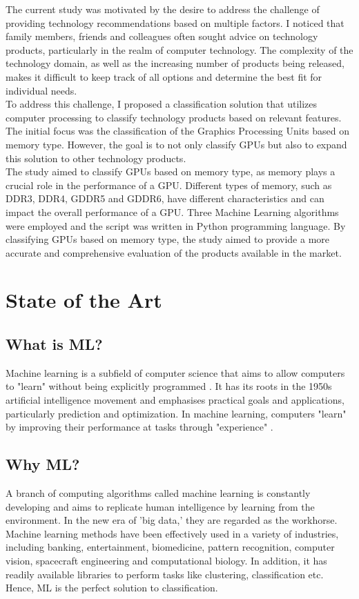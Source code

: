 \documentclass[conference]{IEEEtran}
\begin{document}
The current study was motivated by the desire to address the challenge of providing technology recommendations based on multiple factors. I noticed that family members, friends and colleagues often sought advice on technology products, particularly in the realm of computer technology. The complexity of the technology domain, as well as the increasing number of products being released, makes it difficult to keep track of all options and determine the best fit for individual needs.\\

To address this challenge, I proposed a classification solution that utilizes computer processing to classify technology products based on relevant features. The initial focus was the classification of the Graphics Processing Units based on memory type. However, the goal is to not only classify GPUs but also to expand this solution to other technology products.\\

The study aimed to classify GPUs based on memory type, as memory plays a crucial role in the performance of a GPU. Different types of memory, such as DDR3, DDR4, GDDR5 and GDDR6, have different characteristics and can impact the overall performance of a GPU. Three Machine Learning algorithms were employed and the script was written in Python programming language. By classifying GPUs based on memory type, the study aimed to provide a more accurate and comprehensive evaluation of the products available in the market.
\section{State of the Art}
	\subsection{What is ML?}
	Machine learning is a subfield of computer science that aims to allow computers to "learn" without being explicitly programmed \cite{C0}. It has its roots in the 1950s artificial intelligence movement and emphasises practical goals and applications, particularly prediction and optimization. In machine learning, computers "learn" by improving their performance at tasks through "experience" \cite{C01}.
	\subsection{Why ML?}
	A branch of computing algorithms called machine learning is constantly developing and aims to replicate human intelligence by learning from the environment. In the new era of 'big data,' they are regarded as the workhorse. Machine learning methods have been effectively used in a variety of industries, including banking, entertainment, biomedicine, pattern recognition, computer vision, spacecraft engineering and computational biology. In addition, it has readily available libraries to perform tasks like clustering, classification etc. Hence, ML is the perfect solution to classification.\\
\end{document}
